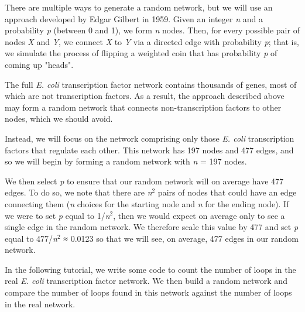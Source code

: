 There are multiple ways to generate a random network, but we will use an approach developed by Edgar Gilbert in 1959. Given an integer \textit{n} and a probability \textit{p} (between 0 and 1), we form \textit{n} nodes. Then, for every possible pair of nodes \textit{X} and \textit{Y}, we connect \textit{X} to \textit{Y} via a directed edge with probability \textit{p}; that is, we simulate the process of flipping a weighted coin that has probability \textit{p} of coming up "heads".

\begin{note}\end{note}

\begin{qbox}\end{qbox} 

The full \textit{E. coli} transcription factor network contains thousands of genes, most of which are not transcription factors. As a result, the approach described above may form a random network that connects non-transcription factors to other nodes, which we should avoid.

Instead, we will focus on the network comprising only those \textit{E. coli} transcription factors that regulate each other. This network has 197 nodes and 477 edges, and so we will begin by forming a random network with \textit{n} = 197 nodes.

We then select \textit{p} to ensure that our random network will on average have 477 edges. To do so, we note that there are \textit{n}$^2$ pairs of nodes that could have an edge connecting them (\textit{n} choices for the starting node and \textit{n} for the ending node). If we were to set \textit{p} equal to 1/\textit{n}$^2$, then we would expect on average only to see a single edge in the random network. We therefore scale this value by 477 and set \textit{p} equal to 477/\textit{n}$^2$ ≈ 0.0123 so that we will see, on average, 477 edges in our random network.

In the following tutorial, we write some code to count the number of loops in the real \textit{E. coli} transcription factor network. We then build a random network and compare the number of loops found in this network against the number of loops in the real network.

